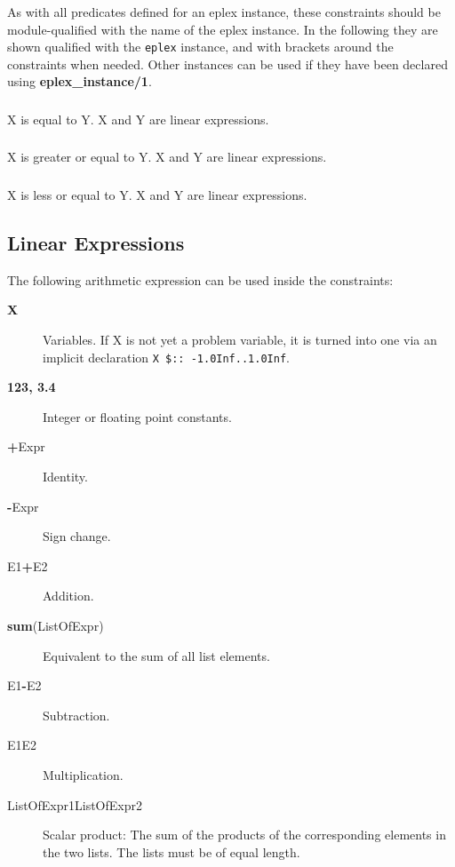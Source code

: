 As with all predicates defined for an eplex instance, these constraints
should be module-qualified with the name of the eplex instance. In the 
following they are shown qualified with the {\tt eplex} instance, and with 
brackets around the constraints when needed. Other instances can
be used if they have been declared using {\bf eplex_instance/1}. 
 
\subsubsection{}
 X is equal to Y. X and Y are linear expressions.

\subsubsection{}
 X is greater or equal to Y. X and Y are linear expressions.

\subsubsection{}
 X is less or equal to Y. X and Y are linear expressions.


\subsection{Linear Expressions}

The following arithmetic expression can be used inside the constraints:
\begin{description}
\item[{\bf X}]
Variables. If X is not yet a problem variable, it is turned into one
	via an implicit declaration {\tt X\ \$::\ -1.0Inf..1.0Inf}.

\item[{\bf 123, 3.4}]
Integer or floating point constants.

\item[{\bf +}Expr]
Identity.

\item[{\bf -}Expr]
Sign change.

\item[E1{\bf +}E2]
Addition.

\item[{\bf sum}(ListOfExpr)]
Equivalent to the sum of all list elements.

\item[E1{\bf -}E2]
Subtraction.

\item[E1{\bf *}E2]
Multiplication.

\item[ListOfExpr1{\bf *}ListOfExpr2]
Scalar product: The sum of the products of the corresponding
elements in the two lists.  The lists must be of equal length.
\end{description}

